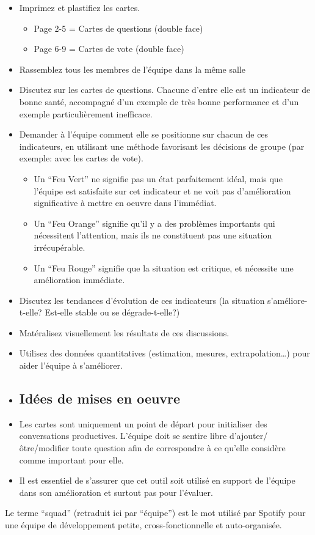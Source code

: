 \begin{itemize}
\item Imprimez et plastifiez les cartes.


\begin{itemize}
\item Page 2-5 = Cartes de questions (double face)
\item Page 6-9 = Cartes de vote (double face)
\end{itemize}
\item Rassemblez tous les membres de l'équipe dans la même salle
\item Discutez sur les cartes de questions. Chacune d'entre elle est un indicateur de bonne santé, accompagné d'un exemple de très bonne performance et d'un exemple particulièrement inefficace.
\item Demander à l'équipe comment elle se positionne sur chacun de ces indicateurs, en utilisant une méthode favorisant les décisions de groupe (par exemple: avec les cartes de vote).


\begin{itemize}
\item Un ``Feu Vert'' ne signifie pas un état parfaitement idéal, mais que l'équipe est satisfaite sur cet indicateur et ne voit pas d'amélioration significative à mettre en oeuvre dans l'immédiat.
\item Un ``Feu Orange'' signifie qu'il y a des problèmes importants qui nécessitent l'attention, mais ils ne constituent pas une situation irrécupérable.
\item Un ``Feu Rouge'' signifie que la situation est critique, et nécessite une amélioration immédiate.
\end{itemize}
\item Discutez les tendances d'évolution de ces indicateurs (la situation s'améliore-t-elle? Est-elle stable ou se dégrade-t-elle?)
\item Matéralisez visuellement les résultats de ces discussions.
\item Utilisez des données quantitatives (estimation, mesures, extrapolation\ldots{}) pour aider l'équipe à s'améliorer.
\item \subsection{Idées de mises en oeuvre}
\item Les cartes sont uniquement un point de départ pour initialiser des conversations productives. L'équipe doit se sentire libre d'ajouter/ôtre/modifier toute question afin de correspondre à ce qu'elle considère comme important pour elle.
\item Il est essentiel de s'assurer que cet outil soit utilisé en support de l'équipe dans son amélioration et surtout pas pour l'évaluer.
\end{itemize}

Le terme ``squad''  (retraduit ici par ``équipe'') est le mot utilisé par Spotify pour une équipe de développement petite, cross-fonctionnelle et auto-organisée.
